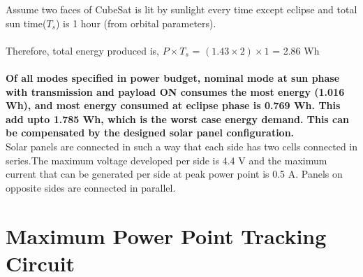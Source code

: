 Assume two faces of CubeSat is lit by sunlight every time except eclipse and total sun time($T_{s}$) is 1 hour (from orbital parameters).
\\ \\ Therefore, total energy produced is, $P \times  T_{s}$ = $(1.43 \times 2) \times 1$ = 2.86 Wh
\\ \\ \textbf{Of all modes specified in power budget, nominal mode at sun phase with transmission and payload ON consumes the most energy (1.016 Wh), and most energy consumed at eclipse phase is 0.769 Wh. This add upto 1.785 Wh, which is the worst case energy demand. This can be compensated by the designed solar panel configuration.}
\\
Solar panels are connected in such a way that each side has two cells connected in series.The maximum voltage developed per side is 4.4 V and the maximum current that can be generated per side at peak power point is 0.5 A.
Panels on opposite sides are connected in parallel.


\section[MPPT Circuit]{Maximum Power Point Tracking Circuit}

